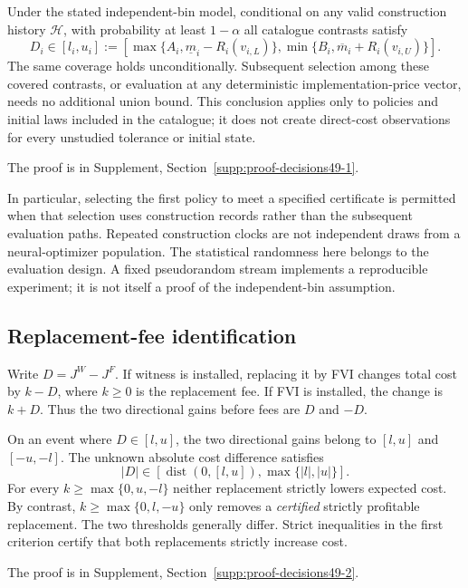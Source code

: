 \begin{theorem}\label{thm:conditional49}
Under the stated independent-bin model, conditional on any valid construction history $\mathcal H$, with probability at least $1-\alpha$ all catalogue contrasts satisfy
\begin{equation}\label{eq:direct49}
 D_i\in[l_i,u_i]:=
 [\max\{A_i,\underline m_i-R_i(v_{i,L})\},
  \min\{B_i,\overline m_i+R_i(v_{i,U})\}].
\end{equation}
The same coverage holds unconditionally. Subsequent selection among these covered contrasts, or evaluation at any deterministic implementation-price vector, needs no additional union bound. This conclusion applies only to policies and initial laws included in the catalogue; it does not create direct-cost observations for every unstudied tolerance or initial state.
\end{theorem}
\noindent The proof is in Supplement, Section~\ref{supp:proof-decisions49-1}.


In particular, selecting the first policy to meet a specified certificate is permitted when that selection uses construction records rather than the subsequent evaluation paths. Repeated construction clocks are not independent draws from a neural-optimizer population. The statistical randomness here belongs to the evaluation design. A fixed pseudorandom stream implements a reproducible experiment; it is not itself a proof of the independent-bin assumption.

\subsection{Replacement-fee identification}
Write $D=J^W-J^F$. If witness is installed, replacing it by FVI changes total cost by $k-D$, where $k\ge0$ is the replacement fee. If FVI is installed, the change is $k+D$. Thus the two directional gains before fees are $D$ and $-D$.

\begin{corollary}\label{cor:fee49}
On an event where $D\in[l,u]$, the two directional gains belong to $[l,u]$ and $[-u,-l]$. The unknown absolute cost difference satisfies
\begin{equation}\label{eq:absolute49}
 |D|\in[\operatorname{dist}(0,[l,u]),\max\{|l|,|u|\}].
\end{equation}
For every $k\ge\max\{0,u,-l\}$ neither replacement strictly lowers expected cost. By contrast, $k\ge\max\{0,l,-u\}$ only removes a \emph{certified} strictly profitable replacement. The two thresholds generally differ. Strict inequalities in the first criterion certify that both replacements strictly increase cost.
\end{corollary}
\noindent The proof is in Supplement, Section~\ref{supp:proof-decisions49-2}.


